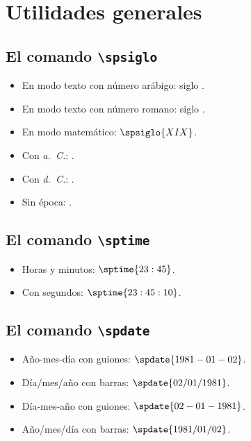 \documentclass{article}
\begin{document}
\section*{Utilidades generales}

\subsection*{El comando \texttt{\textbackslash spsiglo}}

\begin{itemize}
  \item En modo texto con número arábigo: siglo .
  \item En modo texto con número romano: siglo .
  \item En modo matemático: $\spsiglo{XIX}$.
  \item Con \emph{a.~C.}: .
  \item Con \emph{d.~C.}: .
  \item Sin época: .
\end{itemize}

\subsection*{El comando \texttt{\textbackslash sptime}}

\begin{itemize}
  \item Horas y minutos: $\sptime{23:45}$.
  \item Con segundos: $\sptime{23:45:10}$.
\end{itemize}

\subsection*{El comando \texttt{\textbackslash spdate}}

\begin{itemize}
  \item Año-mes-día con guiones: $\spdate{1981-01-02}$.
  \item Día/mes/año con barras: $\spdate{02/01/1981}$.
  \item Día-mes-año con guiones: $\spdate{02-01-1981}$.
  \item Año/mes/día con barras: $\spdate{1981/01/02}$.
\end{itemize}
\end{document}

